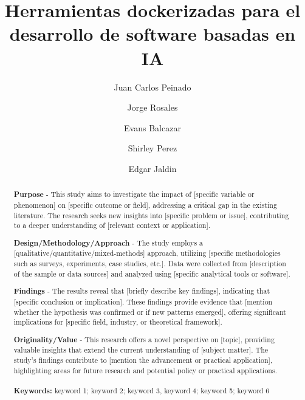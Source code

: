 \documentclass{article}
\author[1]{Juan Carlos Peinado}
\author[2]{Jorge Rosales}
\author[3]{Evans Balcazar}
\author[4]{Shirley Perez}
\author[5]{Edgar Jaldin}
\affil[1]{School of Engineering, Santa Cruz, Bolivia
email (jcpeinadop@soe.uagrm.edu.bo)}
\affil[2]{FICCT, Ciencias de la Computación, Santa Cruz, Bolivia}
\title{Herramientas dockerizadas para el desarrollo de software basadas en IA}
\begin{document}
\maketitle

\begin{abstract}
\textbf{Purpose} - This study aims to investigate the impact of [specific variable or phenomenon] on [specific outcome or field], addressing a critical gap in the existing literature. The research seeks new insights into [specific problem or issue], contributing to a deeper understanding of [relevant context or application].

\textbf{Design/Methodology/Approach} - The study employs a [qualitative/quantitative/mixed-methods] approach, utilizing [specific methodologies such as surveys, experiments, case studies, etc.]. Data were collected from [description of the sample or data sources] and analyzed using [specific analytical tools or software].

\textbf{Findings} - The results reveal that [briefly describe key findings], indicating that [specific conclusion or implication]. These findings provide evidence that [mention whether the hypothesis was confirmed or if new patterns emerged], offering significant implications for [specific field, industry, or theoretical framework].

\textbf{Originality/Value} - This research offers a novel perspective on [topic], providing valuable insights that extend the current understanding of [subject matter]. The study’s findings contribute to [mention the advancement or practical application], highlighting areas for future research and potential policy or practical applications. 
\\
\\
\textbf{Keywords:} keyword 1; keyword 2; keyword 3, keyword 4; keyword 5; keyword 6
\end{abstract}
\linenumbers

\end{document}
